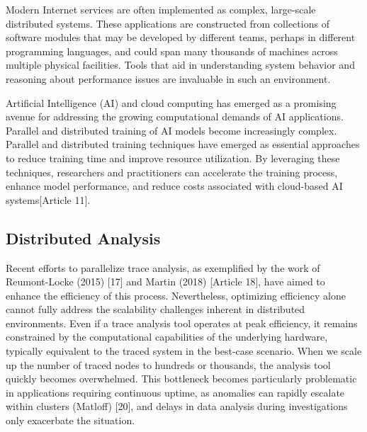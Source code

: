 Modern Internet services are often implemented as complex, large-scale distributed systems. These applications are constructed from collections of software modules that may be developed by different teams, perhaps in different programming languages, and could span many thousands of machines across multiple physical facilities. Tools that aid in understanding system behavior and reasoning about performance issues are invaluable in such an environment.

Artificial Intelligence (AI) and cloud computing has emerged as a promising avenue for addressing the growing computational demands of AI applications. Parallel and distributed training of AI models become increasingly complex. Parallel and distributed training techniques have emerged as essential approaches to reduce training time and improve resource utilization. By leveraging these techniques, researchers and practitioners can accelerate the training process, enhance model performance, and reduce costs associated with cloud-based AI systems[Article 11].





\subsection{Distributed Analysis}


Recent efforts to parallelize trace analysis, as exemplified by the work of Reumont-Locke (2015) [17] and Martin (2018) [Article 18], have aimed to enhance the efficiency of this process. Nevertheless, optimizing efficiency alone cannot fully address the scalability challenges inherent in distributed environments. Even if a trace analysis tool operates at peak efficiency, it remains constrained by the computational capabilities of the underlying hardware, typically equivalent to the traced system in the best-case scenario. When we scale up the number of traced nodes to hundreds or thousands, the analysis tool quickly becomes overwhelmed. This bottleneck becomes particularly problematic in applications requiring continuous uptime, as anomalies can rapidly escalate within clusters (Matloff) [20], and delays in data analysis during investigations only exacerbate the situation.

